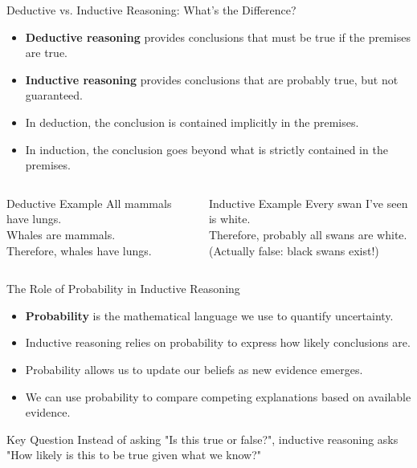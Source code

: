\documentclass{beamer}
\begin{document}
	\begin{frame}{Deductive vs. Inductive Reasoning: What's the Difference?}
		\begin{itemize}
			\item \textbf{Deductive reasoning} provides conclusions that must be true if the premises are true.
			\item \textbf{Inductive reasoning} provides conclusions that are probably true, but not guaranteed.
			\item In deduction, the conclusion is contained implicitly in the premises.
			\item In induction, the conclusion goes beyond what is strictly contained in the premises.
		\end{itemize}
		
		\begin{columns}
			\begin{column}{0.48\textwidth}
				\begin{exampleblock}{Deductive Example}
					All mammals have lungs.\\
					Whales are mammals.\\
					Therefore, whales have lungs.
				\end{exampleblock}
			\end{column}
			\begin{column}{0.48\textwidth}
				\begin{exampleblock}{Inductive Example}
					Every swan I've seen is white.\\
					Therefore, probably all swans are white.\\
					(Actually false: black swans exist!)
				\end{exampleblock}
			\end{column}
		\end{columns}
	\end{frame}
	
	\begin{frame}{The Role of Probability in Inductive Reasoning}
		\begin{itemize}
			\item \textbf{Probability} is the mathematical language we use to quantify uncertainty.
			\item Inductive reasoning relies on probability to express how likely conclusions are.
			\item Probability allows us to update our beliefs as new evidence emerges.
			\item We can use probability to compare competing explanations based on available evidence.
		\end{itemize}
		
		\begin{block}{Key Question}
			Instead of asking "Is this true or false?", inductive reasoning asks "How likely is this to be true given what we know?"
		\end{block}
	\end{frame}
	
\end{document}
